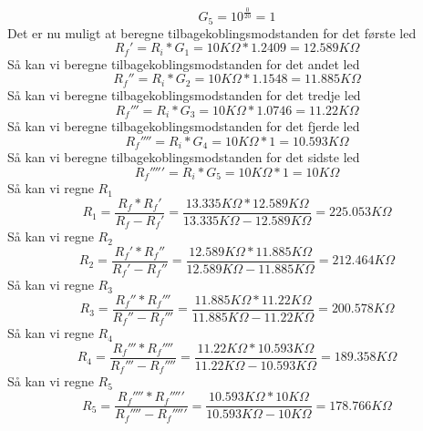 %
\begin{equation}
	G_5 = 10^{\frac{0}{20}} = 1
\end{equation}
\noindent
%
Det er nu muligt at beregne tilbagekoblingsmodstanden for det første led
%
\begin{equation}
	R_f' = R_i*G_1 = 10K\Omega*1.2409 = 12.589K\Omega
\end{equation}
\noindent
%
Så kan vi beregne tilbagekoblingsmodstanden for det andet led
%
\begin{equation}
	R_f'' = R_i*G_2 = 10K\Omega*1.1548 = 11.885K\Omega
\end{equation}
\noindent
%
Så kan vi beregne tilbagekoblingsmodstanden for det tredje led
%
\begin{equation}
	R_f''' = R_i*G_3 = 10K\Omega*1.0746 = 11.22K\Omega
\end{equation}
\noindent
%
Så kan vi beregne tilbagekoblingsmodstanden for det fjerde led
%
\begin{equation}
	R_f'''' = R_i*G_4 = 10K\Omega*1 = 10.593K\Omega
\end{equation}
\noindent
%
%
Så kan vi beregne tilbagekoblingsmodstanden for det sidste led
%
\begin{equation}
	R_f''''' = R_i*G_5 = 10K\Omega*1 = 10K\Omega
\end{equation}
\noindent
%
Så kan vi regne $R_{1}$
%
\begin{equation}
	R_1 = \frac{R_f*R_f'}{R_f-R_f'} = \frac{13.335K\Omega*12.589K\Omega}{13.335K\Omega-12.589K\Omega} = 225.053K\Omega
\end{equation}
\noindent
%
Så kan vi regne $R_{2}$
%
\begin{equation}
	R_2 = \frac{R_f'*R_f''}{R_f'-R_f''} = \frac{12.589K\Omega*11.885K\Omega}{12.589K\Omega-11.885K\Omega} = 212.464K\Omega
\end{equation}
%
Så kan vi regne $R_{3}$
%
\begin{equation}
	R_3 = \frac{R_f''*R_f'''}{R_f''-R_f'''} = \frac{11.885K\Omega*11.22K\Omega}{11.885K\Omega-11.22K\Omega} = 200.578K\Omega
\end{equation}
%
Så kan vi regne $R_{4}$
%
\begin{equation}
	R_4 = \frac{R_f'''*R_f''''}{R_f'''-R_f''''} = \frac{11.22K\Omega*10.593K\Omega}{11.22K\Omega-10.593K\Omega} = 189.358K\Omega
\end{equation}
%
Så kan vi regne $R_{5}$
%
\begin{equation}
	R_5 = \frac{R_f''''*R_f'''''}{R_f''''-R_f'''''} = \frac{10.593K\Omega*10K\Omega}{10.593K\Omega-10K\Omega} = 178.766K\Omega
\end{equation}